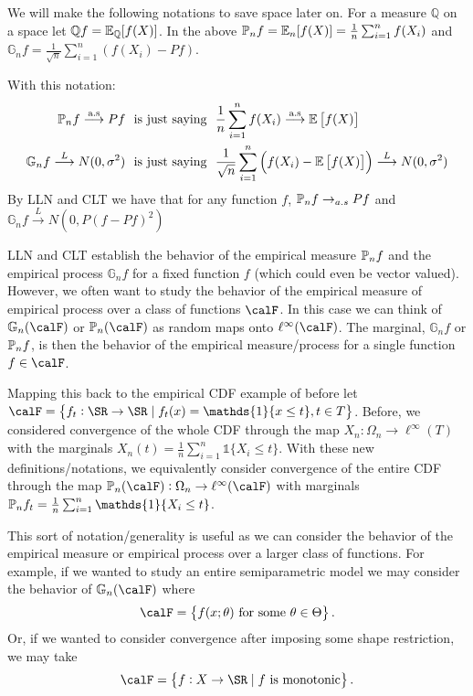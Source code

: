 \begin{remark}[Notation]
    \label{rem:ep-notation}
	We will make the following notations to save space later on. For a measure \(\mathbb{Q}\) on a space let \(\mathbb{Q}f = \E_{\mathbb{Q}}[f(X)]\). In the above \(\P_nf = \E_{n}[f(X)] = \frac{1}{n}\sum_{i=1}^n f(X_i) \) and \(\mathbb{G}_n f = \frac{1}{\sqrt{n}}\sum_{i=1}^n \left(f(X_i) - Pf\right)\).

	With this notation:
	\begin{align*}
		\P_nf\overset{\text{a.s}}{\longrightarrow}Pf&\hbox{  }\text{ is just saying }\hbox{ }\frac{1}{n}\sum_{i=1}^n f(X_i)\overset{\text{a.s}}{\longrightarrow}\E\left[f(X)\right]\\ 
		\mathbb{G}_nf\overset{L}{\longrightarrow}N(0,\sigma^2)&\hbox{  }\text{ is just saying }\hbox{  }\frac{1}{\sqrt{n}}\sum_{i=1}^n \left(f(X_i)-\E\left[f(X)\right]\right)\overset{L}{\longrightarrow}N(0,\sigma^2) 
	\end{align*}
	By LLN and CLT we have that for any function \(f\),  \(\P_nf \to_{a.s}Pf\) and \(\mathbb{G}_nf \overset{L}{\to}N\left(0,P\left(f-Pf\right)^2\right)\)
\end{remark}

\begin{example}
	\label{ex:calF}
	LLN and CLT establish the behavior of the empirical measure \(\P_nf\) and the empirical process \(\mathbb{G}_nf\) for a fixed function \(f\) (which could even be vector valued). However, we often want to study the behavior of the empirical measure of empirical process over a class of functions  \(\calF\). In this case we can think of  \(\mathbb{G}_n(\calF)\) or \(\P_n(\calF)\) as random maps onto \(\ell^\infty(\calF)\). The marginal, \(\mathbb{G}_nf\) or \(\P_nf\), is then the behavior of the empirical measure/process for a single function \(f\in\calF\).

	Mapping this back to the empirical CDF example of before let \(\calF = \left\{f_t:\SR\to \SR\mid f_t(x) = \mathds{1}\{x\leq t\}, t \in T\right\}\). Before, we considered convergence of the whole CDF through the map \(X_n:\Omega_n \to \ell^\infty(T)\) with the marginals \(X_n(t) = \frac{1}{n}\sum_{i=1}^n \mathds{1}\{X_i \leq t\}  \). With these new definitions/notations, we equivalently consider convergence of the entire CDF through the map \(\P_n(\calF):\Omega_n \to \ell^\infty(\calF)\) with marginals \(\P_nf_t = \frac{1}{n}\sum_{i=1}^n \mathds{1}\{X_i \leq t\} \).

	This sort of notation/generality is useful as we can consider the behavior of the empirical measure or empirical process over a larger class of functions. For example, if we wanted to study an entire semiparametric model we may consider the behavior of \(\mathbb{G}_n(\calF)\) where 
	\[
		\calF = \left\{f(x;\theta)\text{ for some }\theta\in\Theta\right\}
	.\]
	Or, if we wanted to consider convergence after imposing some shape restriction, we may take
	\[
		\calF = \left\{f:X\to\SR\mid f\text{ is monotonic}\right\}
	.\] 
\end{example}

